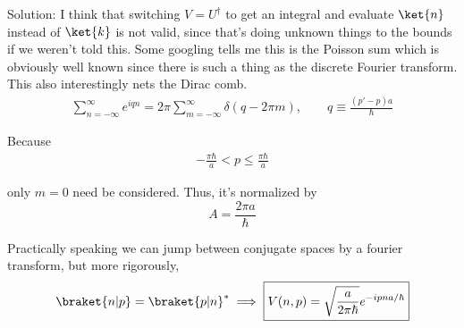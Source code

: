 \begin{homeworkProblem}
\begin{enumerate}[(a)]
\begin{callout}{Solution:}
                I think that switching $V=U^\dagger$ to get an integral and evaluate $\ket{n}$ instead of $\ket{k}$ is not valid, since that's doing unknown things to the bounds if we weren't told this. Some googling tells me this is the Poisson sum which is obviously well known since there is such a thing as the discrete Fourier transform. This also interestingly nets the Dirac comb.
                \begin{align*}
                    \sum_{n=-\infty}^{\infty} e^{iqn} = 2\pi \sum_{m=-\infty}^{\infty} \delta(q-2\pi m), \qquad q \equiv \frac{(p'-p)a}{\hbar}
                \end{align*}

                Because 
                \begin{align*}
                    - \frac{\pi \hbar}{a}< p \leq \frac{\pi \hbar}{a}
                \end{align*}

                only $m=0$ need be considered. Thus, it's normalized by
                $$A = \frac{2\pi a}{\hbar}$$

                Practically speaking we can jump between conjugate spaces by a fourier transform, but more rigorously,
                $$\braket{n|p} = \braket{p|n}^* \implies \boxed{V(n,p) = \sqrt{\frac{a}{2\pi\hbar}} e^{-ipna / \hbar}}$$

            \end{callout}
    \end{enumerate}
\end{homeworkProblem}


